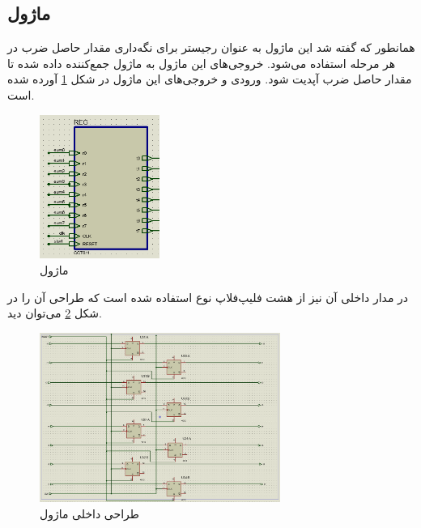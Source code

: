 \documentclass[12pt,onecolumn,a4paper,fleqn]{article}
\begin{document}
	\subsection{ماژول ‌}
	همانطور که گفته شد این ماژول به عنوان رجیستر برای نگه‌داری مقدار حاصل ضرب در هر مرحله استفاده می‌شود. خروجی‌های این ماژول به ماژول جمع‌کننده داده شده تا مقدار حاصل ضرب آپدیت شود. ورودی‌ و خروجی‌های این ماژول در شکل \ref{fig:register} آورده شده است.
	\begin{figure}[H]
		\centering
		\includegraphics[width=0.35\textwidth]{source/register.png}
		\caption{ماژول }
		\label{fig:register}
	\end{figure}
	در مدار داخلی آن نیز از هشت فلیپ‌فلاپ نوع  استفاده شده است که طراحی آن را در شکل \ref{fig:register_inner} می‌توان دید.
	\begin{figure}[H]
		\centering
		\includegraphics[width=0.7\textwidth]{source/register_inner.png}
		\caption{طراحی داخلی ماژول }
		\label{fig:register_inner}
	\end{figure}
	\newpage
\end{document}
